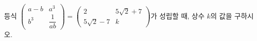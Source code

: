 등식 $\begin{pmatrix} a-b & a^3 \\[2mm] b^3 & \dfrac{1}{ab} \end{pmatrix}=\begin{pmatrix} 2 & 5\sqrt{2}+7 \\[2mm] 5\sqrt{2}-7 & k \end{pmatrix}$가 성립할 때, 상수 $k$의 값을 구하시오. 
